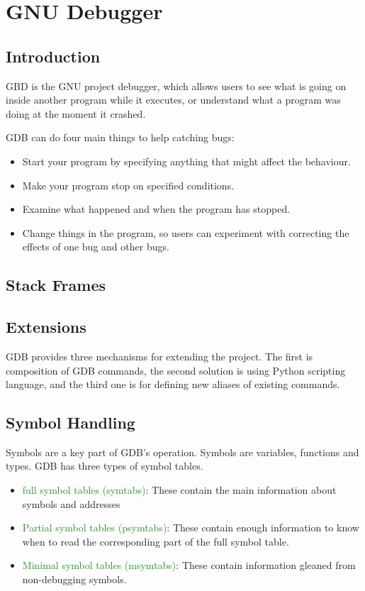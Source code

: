 \chapter{GNU Debugger} \label{GDB}

\section{Introduction}
GBD is the GNU project debugger, which allows users to see what is going on
inside another program while it executes, or understand what a program was
doing at the moment it crashed.

GDB can do four main things to help catching bugs:
\begin{itemize}
\item Start your program by specifying anything that might affect the
behaviour.
\item Make your program stop on specified conditions.
\item Examine what happened and when the program has stopped.
\item Change things in the program, so users can experiment with correcting the
effects of one bug and other bugs.
\end{itemize}

\section{Stack Frames}

\section{Extensions}
GDB provides three mechanisms for extending the project. The first is
composition of GDB commands, the second solution is using Python scripting
language, and the third one is for defining new aliases of existing commands.

\section{Symbol Handling}
Symbols are a key part of GDB's operation. Symbols are variables, functions and
types. GDB has three types of symbol tables.
\begin{itemize}
    \item \textcolor{ForestGreen}{full symbol tables (symtabs)}: These contain the main information
        about symbols and addresses
    \item \textcolor{ForestGreen} {Partial symbol tables (psymtabs)}: These contain enough information to
        know when to read the corresponding part of the full symbol table.
    \item \textcolor{ForestGreen}{Minimal symbol tables (msymtabs)}: These contain information gleaned
        from non-debugging symbols.
\end{itemize}

